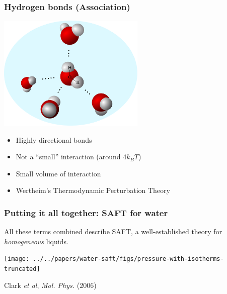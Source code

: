 \begin{frame}
  \frametitle{Hydrogen bonds (Association)}
  \vspace{-2em}
  \hfill\includegraphics[width=7cm]{figs/hydrogen-bonds}\hspace{-3em}
  \vspace{-2em}
  \begin{itemize}
  \item Highly directional bonds
  \item Not a ``small'' interaction (around $4k_BT$)
  \item Small volume of interaction
  \item Wertheim's Thermodynamic Perturbation Theory\\ \hfill
  \end{itemize}
\end{frame}

\begin{frame}
  \frametitle{Putting it all together:  SAFT for water}
  All these terms combined describe SAFT, a well-established theory
  for \emph{homogeneous} liquids.
  \begin{center}
    \vspace{-1em}
    \texttt{[image: ../../papers/water-saft/figs/pressure-with-isotherms-truncated]}
  \end{center}
  \hfill Clark \emph{et al}, \emph{Mol. Phys.}
  (2006)
\end{frame}

